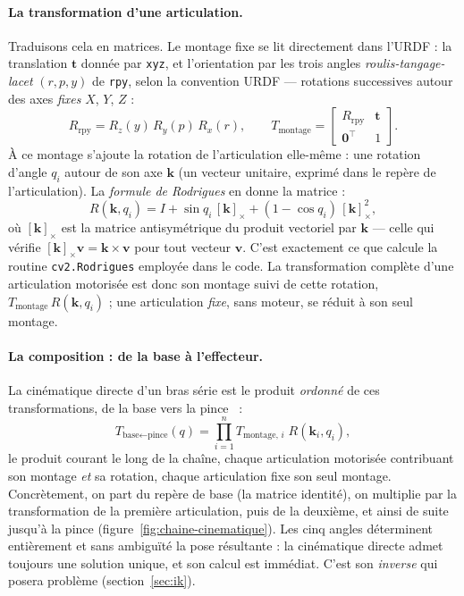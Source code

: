 \paragraph{La transformation d'une articulation.} Traduisons cela en matrices. Le montage fixe se lit directement dans l'URDF : la translation $\mathbf{t}$ donnée par \texttt{xyz}, et l'orientation par les trois angles \emph{roulis-tangage-lacet} $(r,p,y)$ de \texttt{rpy}, selon la convention URDF --- rotations successives autour des axes \emph{fixes} $X$, $Y$, $Z$ :
\[
  R_{\text{rpy}} = R_z(y)\,R_y(p)\,R_x(r),
  \qquad
  T_{\text{montage}} = \begin{bmatrix} R_{\text{rpy}} & \mathbf{t} \\ \mathbf{0}^{\top} & 1 \end{bmatrix}.
\]
À ce montage s'ajoute la rotation de l'articulation elle-même : une rotation d'angle $q_i$ autour de son axe $\mathbf{k}$ (un vecteur unitaire, exprimé dans le repère de l'articulation). La \emph{formule de Rodrigues} en donne la matrice :
\[
  R(\mathbf{k}, q_i) = I + \sin q_i \,[\mathbf{k}]_\times + (1 - \cos q_i)\,[\mathbf{k}]_\times^{2} ,
\]
où $[\mathbf{k}]_\times$ est la matrice antisymétrique du produit vectoriel par $\mathbf{k}$ --- celle qui vérifie $[\mathbf{k}]_\times \mathbf{v} = \mathbf{k}\times\mathbf{v}$ pour tout vecteur $\mathbf{v}$. C'est exactement ce que calcule la routine \texttt{cv2.Rodrigues} employée dans le code. La transformation complète d'une articulation motorisée est donc son montage suivi de cette rotation, $T_{\text{montage}}\,R(\mathbf{k}, q_i)$ ; une articulation \emph{fixe}, sans moteur, se réduit à son seul montage.

\paragraph{La composition : de la base à l'effecteur.} La cinématique directe d'un bras série est le produit \emph{ordonné} de ces transformations, de la base vers la pince~\cite{siciliano_robotics_2009} :
\[
  T_{\text{base}\leftarrow\text{pince}}(q)
  = \prod_{i=1}^{n} T_{\text{montage},\,i}\; R(\mathbf{k}_i, q_i) ,
\]
le produit courant le long de la chaîne, chaque articulation motorisée contribuant son montage \emph{et} sa rotation, chaque articulation fixe son seul montage. Concrètement, on part du repère de base (la matrice identité), on multiplie par la transformation de la première articulation, puis de la deuxième, et ainsi de suite jusqu'à la pince (figure~\ref{fig:chaine-cinematique}). Les cinq angles déterminent entièrement et sans ambiguïté la pose résultante : la cinématique directe admet toujours une solution unique, et son calcul est immédiat. C'est son \emph{inverse} qui posera problème (section~\ref{sec:ik}).

